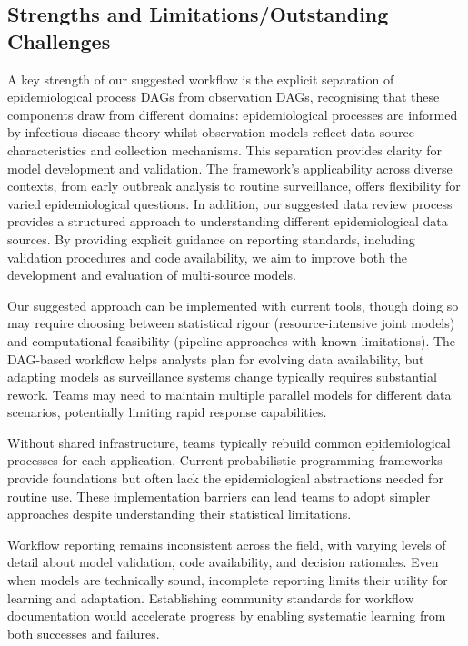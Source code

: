 \documentclass{article}
\begin{document}
\subsection{Strengths and Limitations/Outstanding Challenges}

A key strength of our suggested workflow is the explicit separation of epidemiological process DAGs from observation DAGs, recognising that these components draw from different domains: epidemiological processes are informed by infectious disease theory whilst observation models reflect data source characteristics and collection mechanisms.
This separation provides clarity for model development and validation.
The framework's applicability across diverse contexts, from early outbreak analysis to routine surveillance, offers flexibility for varied epidemiological questions.
In addition, our suggested data review process provides a structured approach to understanding different epidemiological data sources.
By providing explicit guidance on reporting standards, including validation procedures and code availability, we aim to improve both the development and evaluation of multi-source models.

Our suggested approach can be implemented with current tools, though doing so may require choosing between statistical rigour (resource-intensive joint models) and computational feasibility (pipeline approaches with known limitations).
The DAG-based workflow helps analysts plan for evolving data availability, but adapting models as surveillance systems change typically requires substantial rework.
Teams may need to maintain multiple parallel models for different data scenarios, potentially limiting rapid response capabilities.

Without shared infrastructure, teams typically rebuild common epidemiological processes for each application.
Current probabilistic programming frameworks provide foundations but often lack the epidemiological abstractions needed for routine use.
These implementation barriers can lead teams to adopt simpler approaches despite understanding their statistical limitations.

Workflow reporting remains inconsistent across the field, with varying levels of detail about model validation, code availability, and decision rationales.
Even when models are technically sound, incomplete reporting limits their utility for learning and adaptation.
Establishing community standards for workflow documentation would accelerate progress by enabling systematic learning from both successes and failures.
\end{document}
